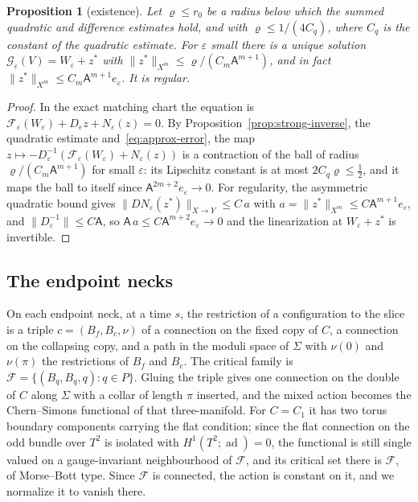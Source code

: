 \documentclass[11pt]{amsart}
\newtheorem{proposition}[theorem]{Proposition}
\theoremstyle{definition}
\theoremstyle{remark}
\theoremstyle{plain}
\numberwithin{equation}{section}
\newcommand{\cF}{\mathcal{F}}
\newcommand{\cG}{\mathcal{G}}
\newcommand{\ad}{\operatorname{ad}}
\newcommand{\eps}{\varepsilon}
\begin{document}
\begin{proposition}[existence]\label{prop:existence}
Let $\varrho\le r_0$ be a radius below which the summed quadratic and difference
estimates hold, and with $\varrho\le1/(4C_q)$, where $C_q$ is the constant of the
quadratic estimate. For $\eps$ small there is a unique solution $\cG_\eps(V)=W_\eps+z^*$ with
$\|z^*\|_{X^m}\le\varrho/(C_m\mathsf A^{m+1})$, and in fact $\|z^*\|_{X^m}\le C_m\mathsf A^{m+1}e_\eps$.
It is regular.
\end{proposition}

\begin{proof}
In the exact matching chart the equation is
$\mathcal F_\eps(W_\eps)+D_\eps z+N_\eps(z)=0$. By Proposition~\ref{prop:strong-inverse},
the quadratic estimate and~\eqref{eq:approx-error}, the map
$z\mapsto-D_\eps^{-1}(\mathcal F_\eps(W_\eps)+N_\eps(z))$ is a contraction of the ball of
radius $\varrho/(C_m\mathsf A^{m+1})$ for small $\eps$: its Lipschitz constant is at most
$2C_q\varrho\le\frac12$, and it maps the ball to itself since $\mathsf A^{2m+2}e_\eps\to0$.
For regularity, the asymmetric quadratic bound gives
$\|DN_\eps(z^*)\|_{X\to Y}\le C\,a$ with $a=\|z^*\|_{X^m}\le C\mathsf A^{m+1}e_\eps$, and
$\|D_\eps^{-1}\|\le C\mathsf A$, so $\mathsf A\,a\le C\mathsf A^{m+2}e_\eps\to0$ and the
linearization at $W_\eps+z^*$ is invertible.
\end{proof}

\subsection{The endpoint necks}\label{subsec:necks}

On each endpoint neck, at a time $s$, the restriction of a configuration
to the slice is a triple $c=(B_f,B_c,\nu)$ of a connection on the fixed
copy of $C$, a connection on the collapsing copy, and a path in the
moduli space of $\Sigma$ with $\nu(0)$ and $\nu(\pi)$ the restrictions of
$B_f$ and $B_c$. The critical family is $\cF=\{(B_q,B_q,q):q\in P\}$.
Gluing the triple gives one connection on the double of $C$ along $\Sigma$
with a collar of length $\pi$ inserted, and the mixed action becomes the
Chern--Simons functional of that three-manifold. For $C=C_1$ it has two torus
boundary components carrying the flat condition; since the flat connection on
the odd bundle over $T^2$ is isolated with $H^1(T^2;\ad)=0$, the functional is
still single valued on a gauge-invariant neighbourhood of $\cF$, and its critical set
there is $\cF$, of Morse--Bott type. Since $\cF$ is connected, the action is constant on
it, and we normalize it to vanish there.
\end{document}
